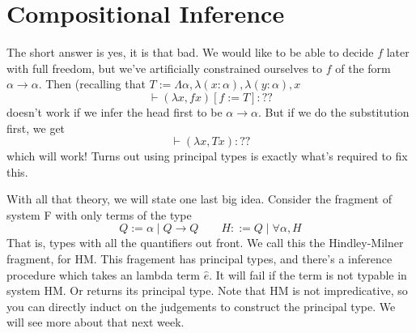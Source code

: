 \documentclass[12pt]{article}
\begin{document}
\section{Compositional Inference}
The short answer is yes, it is that bad. 
We would like to be able to decide $f$ later with full freedom, but we've artificially constrained ourselves to $f$ of the form $\alpha \rightarrow \alpha$.
Then (recalling that $T := \Lambda \alpha, \lambda (x : \alpha),\lambda (y : \alpha), x$
\[
  \vdash (\lambda x, f x)[f := T] : ??
\]
doesn't work if we infer the head first to be $\alpha \rightarrow \alpha$. 
But if we do the substitution first, we get 
\[
  \vdash (\lambda x, T x) : ??
\]
which will work!
Turns out using principal types is exactly what's required to fix this.

With all that theory, we will state one last big idea. Consider the fragment of system F with only terms of the type
\[
Q := \alpha \;|\; Q \rightarrow Q \quad\quad H ::=  Q \;|\; \forall \alpha, H
\]
That is, types with all the quantifiers out front.
We call this the Hindley-Milner fragment, for HM. 
This fragement has principal types, and there's a inference procedure which takes an lambda term $\hat{e}$. It will fail if the term is not typable in system HM. Or returns its principal type.
Note that HM is not impredicative, so you can directly induct on the judgements to construct the principal type.
We will see more about that next week.
\end{document}
